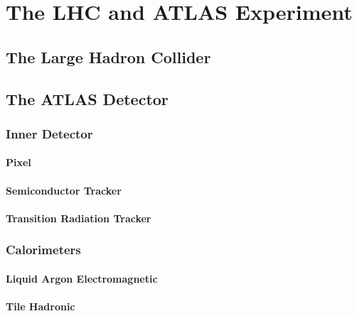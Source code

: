\chapter{The LHC and ATLAS Experiment}

\section{The Large Hadron Collider}{
	
}

\section{The ATLAS Detector}{
	
}

	\subsection{Inner Detector}{

	}

		\subsubsection{Pixel}{

		}

		\subsubsection{Semiconductor Tracker}{

		}

		\subsubsection{Transition Radiation Tracker}{

		}

	\subsection{Calorimeters}{

	}

		\subsubsection{Liquid Argon Electromagnetic}{

		}

		\subsubsection{Tile Hadronic}{

		}

